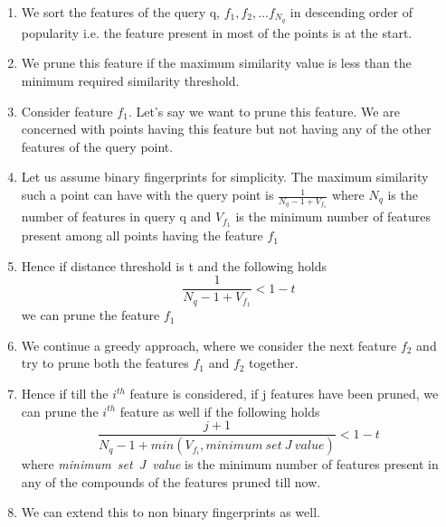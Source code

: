 \begin{enumerate}
	\item We sort the features of the query q, $f_1,f_2,...f_{N_q}$ in descending order of popularity i.e. the feature present in most of the points is at the start.
	
	\item We prune this feature if the maximum similarity value is less than the minimum required similarity threshold.
	
	\item Consider feature $f_1$. Let's say we want to prune this feature. We are concerned with points having this feature but not having any of the other features of the query point. 
	
	\item Let us assume binary fingerprints for simplicity. The maximum similarity such a point can have with the query point is $\frac{1}{N_q - 1 + V_{f_1}}$ where $N_q$ is the number of features in query q and $V_{f_1}$ is the minimum number of features present among all points having the feature $f_1$
	
	\item Hence if  distance threshold is t and the following holds
	\[\frac{1}{N_q - 1 + V_{f_1}}  < 1-t\]
we can prune the feature $f_1$		
	
	\item We continue a greedy approach, where we consider the next feature $f_2$ and try to prune both the features $f_1$ and $f_2$ together.
	
	\item Hence if till the $i^{th}$ feature is considered, if j features have been pruned, we can prune the $i^{th}$ feature as well if the following holds
	\[\frac{j+1}{N_q - 1 + min(V_{f_i}, minimum~set~J~value)} < 1-t \] where  \textit{minimum~set~J~value} is the minimum number of features present in any of the compounds of the features pruned till now.
	
	\item We can extend this to non binary fingerprints as well.
	
\end{enumerate}

